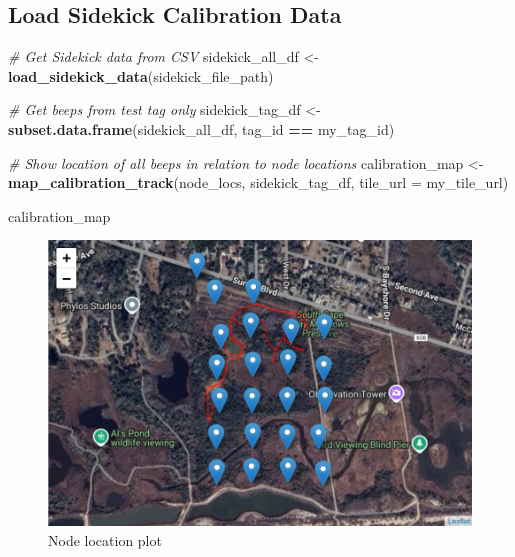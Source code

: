 \documentclass[
]{book}
\newenvironment{Shaded}{\begin{snugshade}}{\end{snugshade}}
\newcommand{\AttributeTok}[1]{\textcolor[rgb]{0.13,0.29,0.53}{#1}}
\newcommand{\CommentTok}[1]{\textcolor[rgb]{0.56,0.35,0.01}{\textit{#1}}}
\newcommand{\FunctionTok}[1]{\textcolor[rgb]{0.13,0.29,0.53}{\textbf{#1}}}
\newcommand{\NormalTok}[1]{#1}
\newcommand{\OtherTok}[1]{\textcolor[rgb]{0.56,0.35,0.01}{#1}}
\newcommand{\SpecialCharTok}[1]{\textcolor[rgb]{0.81,0.36,0.00}{\textbf{#1}}}
\begin{document}
\subsection{Load Sidekick Calibration Data}\label{load-sidekick-calibration-data}

\begin{Shaded}
\begin{Highlighting}[]
\CommentTok{\# Get Sidekick data from CSV}
\NormalTok{sidekick\_all\_df }\OtherTok{\textless{}{-}} \FunctionTok{load\_sidekick\_data}\NormalTok{(sidekick\_file\_path)}

\CommentTok{\# Get beeps from test tag only}
\NormalTok{sidekick\_tag\_df }\OtherTok{\textless{}{-}} \FunctionTok{subset.data.frame}\NormalTok{(sidekick\_all\_df, }
\NormalTok{                                     tag\_id }\SpecialCharTok{==}\NormalTok{ my\_tag\_id)}

\CommentTok{\# Show location of all beeps in relation to node locations}
\NormalTok{calibration\_map }\OtherTok{\textless{}{-}} \FunctionTok{map\_calibration\_track}\NormalTok{(node\_locs, }
\NormalTok{                                         sidekick\_tag\_df, }
                                         \AttributeTok{tile\_url =}\NormalTok{ my\_tile\_url)}

\NormalTok{calibration\_map}
\end{Highlighting}
\end{Shaded}

\begin{figure}
\centering
\includegraphics{images/node_calibration_2.5_sidekick_calibration.png}
\caption{Node location plot}
\end{figure}
\end{document}
